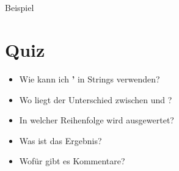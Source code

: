 \subsection{}
\begin{frame}
    \slidehead
    \begin{block}{Beispiel}
    \end{block}
\end{frame}

\livecoding

\section{Quiz}
\begin{frame}
    \slidehead
    \begin{itemize}
        \item Wie kann ich \textbf{'} in Strings verwenden?
            \pause
        \item Wo liegt der Unterschied zwischen  und ?
            \pause
        \item In welcher Reihenfolge wird  ausgewertet?
            \pause
        \item Was ist das Ergebnis?
            \pause
        \item Wofür gibt es Kommentare?
    \end{itemize}
\end{frame}



